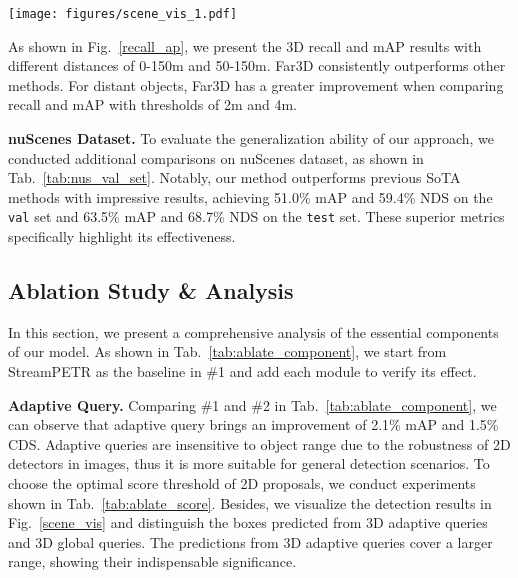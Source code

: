 \documentclass[letterpaper]{article} \usepackage{aaai24}
\begin{document}
\begin{figure*}[t!]
\centering
\texttt{[image: figures/scene\_vis\_1.pdf]}
\caption{Visualization results on Argoverse 2 dataset. 
We show 3D bounding boxes predicted both in multi-camera images and bird’s eye view. 
As illustrated, the view of the front center is distinguished from the other six views. The detection boxes predicted from 3D adaptive queries and 3D global queries are drawn in blue and green respectively. The GTs in orange are presented in BEV only.}
\vspace{-0.3cm}
\label{scene_vis}
\end{figure*}
As shown in Fig.~\ref{recall_ap}, we present the 3D recall and mAP results with different distances of 0-150m and 50-150m. Far3D consistently outperforms other methods. For distant objects, Far3D has a greater improvement when comparing recall and mAP with thresholds of 2m and 4m.

\noindent\textbf{nuScenes Dataset.}
To evaluate the generalization ability of our approach, we conducted additional comparisons on nuScenes dataset, as shown in Tab.~\ref{tab:nus_val_set}. Notably, our method outperforms previous SoTA methods with impressive results, achieving 51.0\% mAP and 59.4\% NDS on the \texttt{val} set and 63.5\% mAP and 68.7\% NDS on the \texttt{test} set. These superior metrics specifically highlight its effectiveness.





\subsection{Ablation Study \& Analysis} \label{sec:ablate}


In this section, we present a comprehensive analysis of the essential components of our model. As shown in Tab.~\ref{tab:ablate_component}, we start from StreamPETR as the baseline in \#1 and add each module to verify its effect. 



\noindent\textbf{Adaptive Query.}
Comparing \#1 and \#2 in Tab.~\ref{tab:ablate_component}, we can observe that adaptive query brings an improvement of 2.1\% mAP and 1.5\% CDS. Adaptive queries are insensitive to object range due to the robustness of 2D detectors in images, thus it is more suitable for general detection scenarios. 
To choose the optimal score threshold of 2D proposals, we conduct experiments shown in Tab.~\ref{tab:ablate_score}. Besides, we visualize the detection results in Fig.~\ref{scene_vis} and distinguish the boxes predicted from 3D adaptive queries and 3D global queries. The predictions from 3D adaptive queries cover a larger range, showing their indispensable significance.
\end{document}
